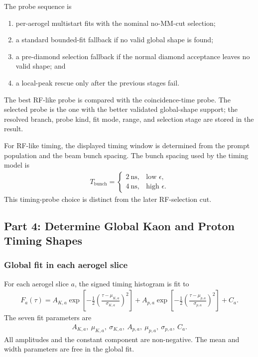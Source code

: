 \documentclass[11pt]{article}
\begin{document}
The probe sequence is
\begin{enumerate}[leftmargin=2em]
  \item per-aerogel multistart fits with the nominal no-MM-cut selection;
  \item a standard bounded-fit fallback if no valid global shape is found;
  \item a pre-diamond selection fallback if the normal diamond acceptance leaves
        no valid shape; and
  \item a local-peak rescue only after the previous stages fail.
\end{enumerate}
The best RF-like probe is compared with the coincidence-time probe.  The
selected probe is the one with the better validated global-shape support; the
resolved branch, probe kind, fit mode, range, and selection stage are stored in
the result.

For RF-like timing, the displayed timing window is determined from the prompt
population and the beam bunch spacing.  The bunch spacing used by the timing
model is
\begin{align}
  T_{\mathrm{bunch}}
  =\begin{cases}
      2~\mathrm{ns}, & \text{low }\epsilon,\\
      4~\mathrm{ns}, & \text{high }\epsilon.
    \end{cases}
\end{align}
This timing-probe choice is distinct from the later RF-selection cut.

\subsection{Part 4: Determine Global Kaon and Proton Timing Shapes}

\subsubsection*{Global fit in each aerogel slice}

For each aerogel slice $a$, the signed timing histogram is fit to
\begin{align}
  F_a(\tau)
  =A_{K,a}\exp\!\left[
       -\frac{1}{2}
       \left(\frac{\tau-\mu_{K,a}}{\sigma_{K,a}}\right)^2
     \right]
   +A_{p,a}\exp\!\left[
       -\frac{1}{2}
       \left(\frac{\tau-\mu_{p,a}}{\sigma_{p,a}}\right)^2
     \right]
   +C_a.
\end{align}
The seven fit parameters are
\begin{align}
  A_{K,a},\ \mu_{K,a},\ \sigma_{K,a},\
  A_{p,a},\ \mu_{p,a},\ \sigma_{p,a},\ C_a.
\end{align}
All amplitudes and the constant component are non-negative.  The mean and width
parameters are free in the global fit.
\end{document}
